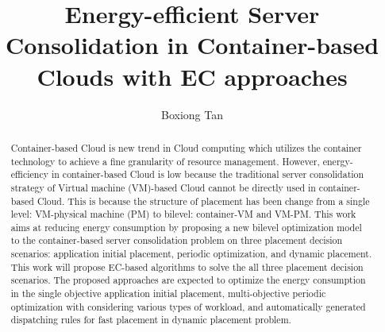 \documentclass[11pt
              , a4paper
              , twoside
              , openright
              ]{report}
\title{Energy-efficient Server Consolidation in Container-based Clouds with EC approaches}
\author{Boxiong Tan}
\date{}
\begin{document}



\begin{abstract}
Container-based Cloud is new trend in Cloud computing which utilizes the container technology to achieve a fine granularity of resource management. However, energy-efficiency in container-based Cloud is low because the traditional server consolidation strategy of Virtual machine (VM)-based Cloud cannot be directly used in container-based Cloud. This is because the structure of placement has been change from a single level: VM-physical machine (PM) to bilevel: container-VM and VM-PM. This work aims at reducing energy consumption by proposing a new bilevel optimization model to the container-based server consolidation problem on three placement decision scenarios: application initial placement, periodic optimization, and dynamic placement. This work will propose EC-based algorithms to solve the all three placement decision scenarios. The proposed approaches are expected to optimize the energy consumption in the single objective application initial placement, multi-objective periodic optimization with considering various types of workload, and automatically generated dispatching rules for fast placement in dynamic placement problem.


\end{abstract}


\maketitle

% 

\tableofcontents



\mainmatter









\backmatter



%


\end{document}
